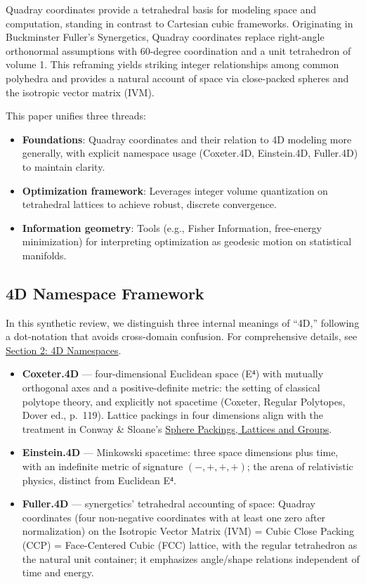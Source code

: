 \documentclass[
  10pt,
]{article}
\providecommand{\tightlist}{%
  \setlength{\itemsep}{0pt}\setlength{\parskip}{0pt}}
\begin{document}
Quadray coordinates provide a tetrahedral basis for modeling space and
computation, standing in contrast to Cartesian cubic frameworks.
Originating in Buckminster Fuller's Synergetics, Quadray coordinates
replace right-angle orthonormal assumptions with 60-degree coordination
and a unit tetrahedron of volume 1. This reframing yields striking
integer relationships among common polyhedra and provides a natural
account of space via close-packed spheres and the isotropic vector
matrix (IVM).

This paper unifies three threads:

\begin{itemize}
\tightlist
\item
  \textbf{Foundations}: Quadray coordinates and their relation to 4D
  modeling more generally, with explicit namespace usage (Coxeter.4D,
  Einstein.4D, Fuller.4D) to maintain clarity.
\item
  \textbf{Optimization framework}: Leverages integer volume quantization
  on tetrahedral lattices to achieve robust, discrete convergence.
\item
  \textbf{Information geometry}: Tools (e.g., Fisher Information,
  free-energy minimization) for interpreting optimization as geodesic
  motion on statistical manifolds.
\end{itemize}

\subsection{4D Namespace Framework}\label{d-namespace-framework}

In this synthetic review, we distinguish three internal meanings of
``4D,'' following a dot-notation that avoids cross-domain confusion. For
comprehensive details, see \href{02_4d_namespaces.md}{Section 2: 4D
Namespaces}.

\begin{itemize}
\tightlist
\item
  \textbf{Coxeter.4D} --- four-dimensional Euclidean space (E⁴) with
  mutually orthogonal axes and a positive-definite metric: the setting
  of classical polytope theory, and explicitly not spacetime (Coxeter,
  Regular Polytopes, Dover ed., p.~119). Lattice packings in four
  dimensions align with the treatment in Conway \& Sloane's
  \href{https://link.springer.com/book/10.1007/978-1-4757-6568-7}{Sphere
  Packings, Lattices and Groups}.
\item
  \textbf{Einstein.4D} --- Minkowski spacetime: three space dimensions
  plus time, with an indefinite metric of signature \((-,+,+,+)\); the
  arena of relativistic physics, distinct from Euclidean E⁴.
\item
  \textbf{Fuller.4D} --- synergetics' tetrahedral accounting of space:
  Quadray coordinates (four non-negative coordinates with at least one
  zero after normalization) on the Isotropic Vector Matrix (IVM) = Cubic
  Close Packing (CCP) = Face-Centered Cubic (FCC) lattice, with the
  regular tetrahedron as the natural unit container; it emphasizes
  angle/shape relations independent of time and energy.
\end{itemize}
\end{document}
